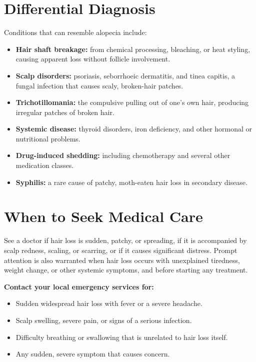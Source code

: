\section*{Differential Diagnosis}
Conditions that can resemble alopecia include:

\begin{itemize}
    \item \textbf{Hair shaft breakage:} from chemical processing, bleaching, or heat styling, causing apparent loss without follicle involvement.
    \item \textbf{Scalp disorders:} psoriasis, seborrhoeic dermatitis, and tinea capitis, a fungal infection that causes scaly, broken-hair patches.
    \item \textbf{Trichotillomania:} the compulsive pulling out of one's own hair, producing irregular patches of broken hair.
    \item \textbf{Systemic disease:} thyroid disorders, iron deficiency, and other hormonal or nutritional problems.
    \item \textbf{Drug-induced shedding:} including chemotherapy and several other medication classes.
    \item \textbf{Syphilis:} a rare cause of patchy, moth-eaten hair loss in secondary disease.
\end{itemize}

\section*{When to Seek Medical Care}
See a doctor if hair loss is sudden, patchy, or spreading, if it is accompanied by scalp redness, scaling, or scarring, or if it causes significant distress. Prompt attention is also warranted when hair loss occurs with unexplained tiredness, weight change, or other systemic symptoms, and before starting any treatment.

\textbf{Contact your local emergency services for:}
\begin{itemize}
    \item Sudden widespread hair loss with fever or a severe headache.
    \item Scalp swelling, severe pain, or signs of a serious infection.
    \item Difficulty breathing or swallowing that is unrelated to hair loss itself.
    \item Any sudden, severe symptom that causes concern.
\end{itemize}

